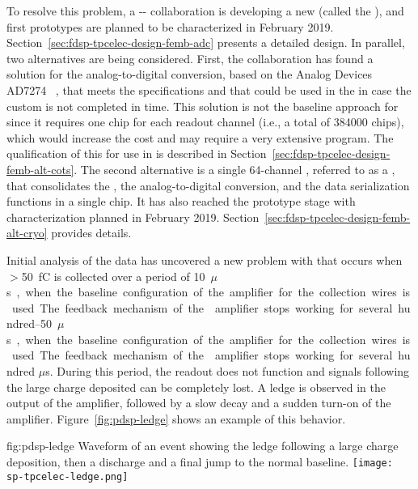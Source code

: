 To resolve this problem, a  -- collaboration 
is developing a new   (called the 
 ), and first
prototypes are planned to be characterized in February 2019.
Section~\ref{sec:fdsp-tpcelec-design-femb-adc} presents a detailed design.  In parallel, two
alternatives are being considered. %
First, the  
collaboration has found %
a  
solution for the analog-to-digital conversion, based on the Analog 
Devices~\cite{AnalogDevices} AD7274~\cite{AD7274} , that meets 
the  specifications %
and that could be used in the  in %
case  the custom  is not %
completed in time. %
This 
solution is not the baseline approach for  since it
requires one chip for each readout channel (i.e., a total
of \num{384000} chips), which would increase the cost %
and may
require a very extensive  program. The qualification
of this   for use in  is described
in Section~\ref{sec:fdsp-tpcelec-design-femb-alt-cots}. 
The second alternative is a single \num{64}-channel , referred to as a ,
that consolidates the , the analog-to-digital conversion, and the
data serialization functions %
in a single chip. %
It has also reached the prototype stage with  %
characterization planned in February 2019. %
Section~\ref{sec:fdsp-tpcelec-design-femb-alt-cryo} provides details.

Initial analysis of the  data has uncovered a new problem with  
that occurs when $>$\SI{50}{fC} is collected over a period of \SIrange{10}{50}{$\mu$s}, 
when the baseline configuration of the amplifier for the collection wires is used. 
The feedback mechanism of the  amplifier stops working for several 
hundred $\mu$s. During this period, the readout does not function and signals 
following the large charge deposited can be completely lost. A ledge is observed 
in the output of the  amplifier, followed by a slow decay 
and a sudden turn-on of the amplifier.
Figure~\ref{fig:pdsp-ledge} shows an example of this behavior.

\begin{dunefigure}
{fig:pdsp-ledge}
{Waveform of an event showing the ledge following a large charge 
deposition, then a discharge and a final jump to the normal baseline.}
\texttt{[image: sp-tpcelec-ledge.png]}
\end{dunefigure}

